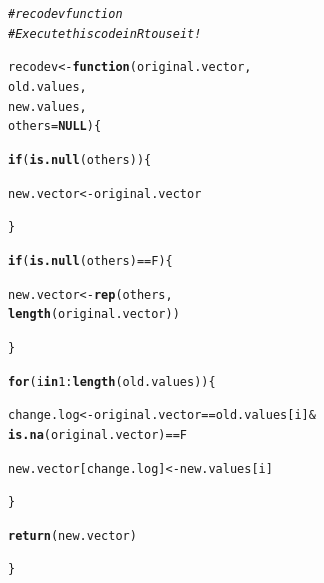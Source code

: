 \documentclass{tufte-book}\usepackage[]{graphicx}\usepackage[]{color}
\makeatletter
\newcommand{\hlnum}[1]{\textcolor[rgb]{0.686,0.059,0.569}{#1}}%
\newcommand{\hlcom}[1]{\textcolor[rgb]{0.678,0.584,0.686}{\textit{#1}}}%
\newcommand{\hlopt}[1]{\textcolor[rgb]{0,0,0}{#1}}%
\newcommand{\hlstd}[1]{\textcolor[rgb]{0.345,0.345,0.345}{#1}}%
\newcommand{\hlkwa}[1]{\textcolor[rgb]{0.161,0.373,0.58}{\textbf{#1}}}%
\newcommand{\hlkwb}[1]{\textcolor[rgb]{0.69,0.353,0.396}{#1}}%
\newcommand{\hlkwc}[1]{\textcolor[rgb]{0.333,0.667,0.333}{#1}}%
\newcommand{\hlkwd}[1]{\textcolor[rgb]{0.737,0.353,0.396}{\textbf{#1}}}%
\newenvironment{kframe}{%
 \def\at@end@of@kframe{}%
 \ifinner\ifhmode%
  \def\at@end@of@kframe{\end{minipage}}%
  \begin{minipage}{\columnwidth}%
 \fi\fi%
 \def\FrameCommand##1{\hskip\@totalleftmargin \hskip-\fboxsep
 \colorbox{shadecolor}{##1}\hskip-\fboxsep
     \hskip-\linewidth \hskip-\@totalleftmargin \hskip\columnwidth}%
 \MakeFramed {\advance\hsize-\width
   \@totalleftmargin\z@ \linewidth\hsize
   \@setminipage}}%
 {\par\unskip\endMakeFramed%
 \at@end@of@kframe}
\newenvironment{knitrout}{}{} %
\makeatother
\begin{document}
\begin{marginfigure}
\begin{knitrout}
\color{fgcolor}\begin{kframe}
\begin{alltt}
\hlcom{#recodev function}
\hlcom{# Execute this code in R to use it!}

\hlstd{recodev} \hlkwb{<-} \hlkwa{function}\hlstd{(}\hlkwc{original.vector}\hlstd{,}
                   \hlkwc{old.values}\hlstd{,}
                   \hlkwc{new.values}\hlstd{,}
                   \hlkwc{others} \hlstd{=} \hlkwa{NULL}\hlstd{) \{}

\hlkwa{if}\hlstd{(}\hlkwd{is.null}\hlstd{(others)) \{}

  \hlstd{new.vector} \hlkwb{<-} \hlstd{original.vector}

\hlstd{\}}

\hlkwa{if}\hlstd{(}\hlkwd{is.null}\hlstd{(others)} \hlopt{==} \hlstd{F) \{}

 \hlstd{new.vector} \hlkwb{<-} \hlkwd{rep}\hlstd{(others,}
                   \hlkwd{length}\hlstd{(original.vector))}

\hlstd{\}}

\hlkwa{for} \hlstd{(i} \hlkwa{in} \hlnum{1}\hlopt{:}\hlkwd{length}\hlstd{(old.values)) \{}

\hlstd{change.log} \hlkwb{<-} \hlstd{original.vector} \hlopt{==} \hlstd{old.values[i]} \hlopt{&}
              \hlkwd{is.na}\hlstd{(original.vector)} \hlopt{==} \hlstd{F}

\hlstd{new.vector[change.log]} \hlkwb{<-} \hlstd{new.values[i]}

\hlstd{\}}

\hlkwd{return}\hlstd{(new.vector)}

\hlstd{\}}
\end{alltt}
\end{kframe}
\end{knitrout}
\end{marginfigure}
\end{document}
